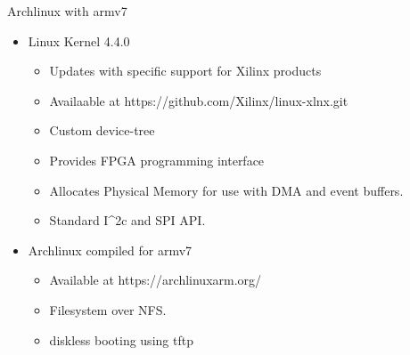 
Archlinux with armv7

\begin{itemize}
\item Linux Kernel 4.4.0
  \begin{itemize}
  \item Updates with specific support for Xilinx products
  \item Availaable at https://github.com/Xilinx/linux-xlnx.git
  \item Custom device-tree
  \item Provides FPGA programming interface
  \item Allocates Physical Memory for use with DMA and event buffers.
  \item Standard I^2c and SPI API.
  \end{itemize}

\item Archlinux compiled for armv7
  \begin{itemize}
  \item Available at https://archlinuxarm.org/
  \item Filesystem over NFS.
  \item diskless booting using tftp
  \end{itemize}

\end{itemize}
